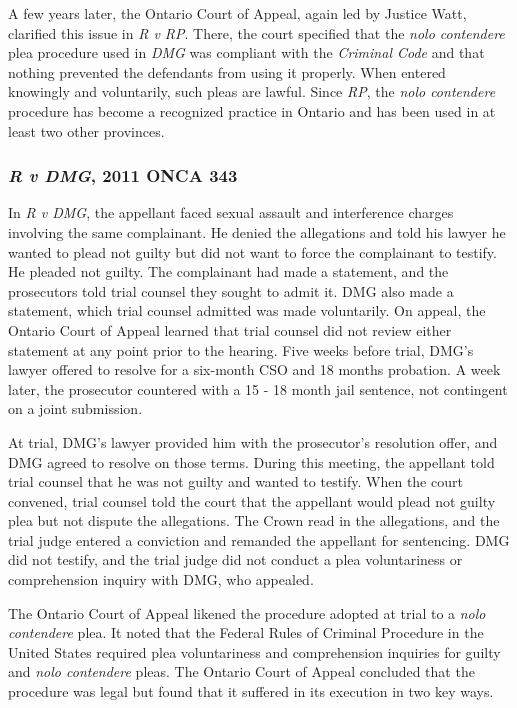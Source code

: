 A few years later, the Ontario Court of Appeal, again led by Justice Watt, clarified this issue in \textit{R v RP}. There, the court specified that the \textit{nolo contendere} plea procedure used in \textit{DMG} was compliant with the \textit{Criminal Code} and that nothing prevented the defendants from using it properly. When entered knowingly and voluntarily, such pleas are lawful. Since \textit{RP}, the \textit{nolo contendere} procedure has become a recognized practice in Ontario and has been used in at least two other provinces.

\subsubsection{\textit{R v DMG}, 2011 ONCA 343}

In \textit{R v DMG}, the appellant faced sexual assault and interference charges involving the same complainant. He denied the allegations and told his lawyer he wanted to plead not guilty but did not want to force the complainant to testify. He pleaded not guilty. The complainant had made a statement, and the prosecutors told trial counsel they sought to admit it. DMG also made a statement, which trial counsel admitted was made voluntarily. On appeal, the Ontario Court of Appeal learned that trial counsel did not review either statement at any point prior to the hearing. Five weeks before trial, DMG's lawyer offered to resolve for a six-month CSO and 18 months probation. A week later, the prosecutor countered with a 15 - 18 month jail sentence, not contingent on a joint submission. 

At trial, DMG's lawyer provided him with the prosecutor's resolution offer, and DMG agreed to resolve on those terms. During this meeting, the appellant told trial counsel that he was not guilty and wanted to testify. When the court convened, trial counsel told the court that the appellant would plead not guilty plea but not dispute the allegations. The Crown read in the allegations, and the trial judge entered a conviction and remanded the appellant for sentencing. DMG did not testify, and the trial judge did not conduct a plea voluntariness or comprehension inquiry with DMG, who appealed.

The Ontario Court of Appeal likened the procedure adopted at trial to a \textit{nolo contendere} plea. It noted that the Federal Rules of Criminal Procedure in the United States required plea voluntariness and comprehension inquiries for guilty and \textit{nolo contendere} pleas. The Ontario Court of Appeal concluded that the procedure was legal but found that it suffered in its execution in two key ways. 

